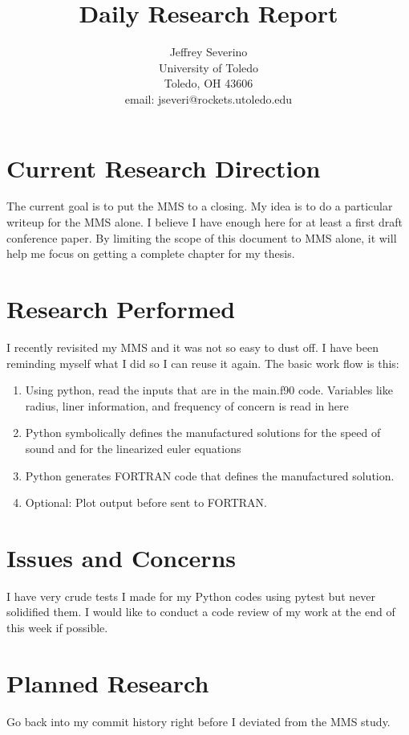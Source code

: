 \documentclass[a4paper]{article}
\begin{document}
\begin{titlepage}

    \title{
    Daily Research Report}

    \author{ Jeffrey Severino \\
        University of Toledo \\
        Toledo, OH  43606 \\
    email: jseveri@rockets.utoledo.edu}


    \maketitle

\end{titlepage}
\section{Current Research Direction}
The current goal is to put the MMS to a closing. My idea is to do a particular
writeup for the MMS alone. I believe I have enough here for at least a first 
draft conference paper. By limiting the scope of this document to MMS alone, 
it will help me focus on getting a complete chapter for my thesis. 

\section{Research Performed}
I recently revisited my MMS and it was not so easy to dust off. I have 
been reminding myself what I did so I can reuse it again. The basic work flow is 
this:

\begin{enumerate}
    \item Using python, read the inputs that are in the main.f90 code. Variables 
        like radius, liner information, and frequency of concern is read in here
    \item Python symbolically defines the manufactured solutions for the 
        speed of sound and for the linearized euler equations
    \item Python generates FORTRAN code that defines the manufactured solution.
       \item Optional: Plot output before sent to FORTRAN.
\end{enumerate}

\section{Issues and Concerns}
I have very crude tests I made for my Python codes using pytest but never solidified 
them. I would like to conduct a code review of my work at the end of this week 
if possible.
\section{Planned Research}
Go back into my commit history right before I deviated from the MMS study.
\end{document}
